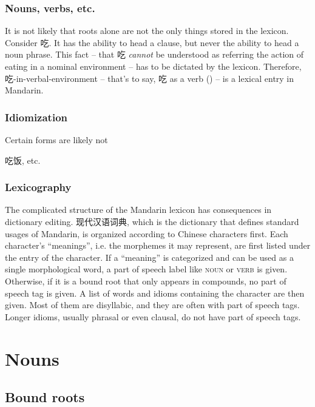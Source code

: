\documentclass[UTF8, a4paper, oneside, scheme=plain, 12pt]{ctexrep}
\newcommand*{\category}[1]{\textsc{#1}}
\begin{document}
\subsection{Nouns, verbs, etc.}\label{sec:grammatical.lexicon.words}

It is not likely that roots alone are not the only things stored in the lexicon.
Consider 吃. It has the ability to head a clause,
but never the ability to head a noun phrase.
This fact -- that 吃 \emph{cannot} be understood as referring the action of eating in a nominal environment -- has to be dictated by the lexicon.
Therefore, 吃-in-verbal-environment -- that's to say, 吃 as a verb () -- 
is a lexical entry in Mandarin.

\subsection{Idiomization}\label{sec:grammatical.lexicon.idiom}

Certain forms are likely not 

吃饭, etc.

\subsection{Lexicography}

The complicated structure of the Mandarin lexicon has consequences in dictionary editing.
现代汉语词典, which is the dictionary that defines standard usages of Mandarin,
is organized according to Chinese characters first.
Each character's ``meanings'',
i.e. the morphemes it may represent,
are first listed under the entry of the character.
If a ``meaning'' is categorized and can be used as a single morphological word,
a part of speech label like \category{noun} or \category{verb} is given.
Otherwise, if it is a bound root that only appears in compounds,
no part of speech tag is given.
A list of words and idioms containing the character are then given.
Most of them are disyllabic, and they are often with part of speech tags.
Longer idioms, usually phrasal or even clausal,
do not have part of speech tags.

\chapter{Nouns}

\section{Bound roots}
\end{document}
